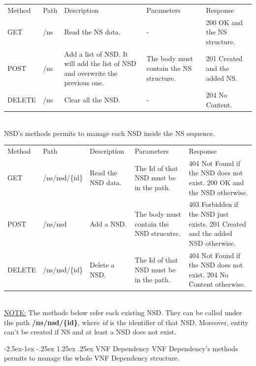 \documentclass[11pt, english]{article}
\makeatletter
\renewcommand\paragraph{\@startsection{paragraph}{4}{\z@}%
            {-2.5ex\@plus -1ex \@minus -.25ex}%
            {1.25ex \@plus .25ex}%
            {\normalfont\normalsize\bfseries}}
\makeatother
\begin{document}
\begin{tabular}{ |p{2cm}|m{3cm}|p{3cm}|p{3cm}|p{4cm}| }
    \hline
    \rowcolor{black} \multicolumn{5}{|c|}{\textcolor{white}{NS}} \\
    \hline
    \rowcolor{Gray}
    Method & Path & Description & Parameters & Response \\
    \hline
    GET   & /ns & Read the NS data. & - & 200 OK and the NS structure. \\
    \hline
    POST & /ns & Add a list of NSD. It will add the list of NSD and overwrite the previous one. & The body must contain the NS structure. & 201 Created and the added NS. \\
    \hline
    DELETE & /ns & Clear all the NSD.  & - & 204 No Content. \\
    \hline
\end{tabular} \\

NSD's methods permits to manage each NSD inside the NS sequence. \\

\begin{tabular}{ |p{2cm}|m{3cm}|p{3cm}|p{3cm}|p{4cm}| }
    \hline
    \rowcolor{black} \multicolumn{5}{|c|}{\textcolor{white}{NSD}} \\
    \hline
    \rowcolor{Gray}
    Method & Path & Description & Parameters & Response \\
    \hline
    GET   & /ns/nsd/\{id\} & Read the NSD data. & The Id of that NSD must be in the path. & 404 Not Found  if the NSD does not exist. 200 OK and the NSD otherwise. \\
    \hline
    POST & /ns/nsd & Add a NSD. & The body must contain the NSD strucutre. & 403 Forbidden if the NSD just exists. 201 Created and the added NSD otherwise. \\
    \hline
    DELETE & /ns/nsd/\{id\} & Delete a NSD. & The Id of that NSD must be in the path. & 404 Not Found  if the NSD does not exist. 204 No Content otherwise. \\
    \hline
\end{tabular} \\

\underline{NOTE:} The methods below refer each existing NSD. They can be called under the path \textbf{/ns/nsd/\{id\}}, where \textit{id} is the identifier of that NSD. Moreover, entity can't be created if NS and at least a NSD does not exist. 

\newpage
\paragraph{VNF Dependency}
VNF Dependency's methods permits to manage the whole VNF Dependency structure. \\
\end{document}
